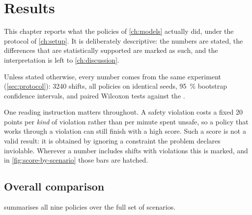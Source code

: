 \chapter{Results}
\label{ch:results}

This chapter reports what the policies of \cref{ch:models} actually did, under the protocol of
\cref{ch:setup}. It is deliberately descriptive: the numbers are stated, the differences that are
statistically supported are marked as such, and the interpretation is left to
\cref{ch:discussion}.

Unless stated otherwise, every number comes from the same experiment (\cref{sec:protocol}):
\num{3240} shifts, all policies on identical seeds, \SI{95}{\percent} bootstrap confidence
intervals, and paired Wilcoxon tests against the \NS.

One reading instruction matters throughout. A safety violation costs a fixed \num{20} points per
\emph{kind} of violation rather than per minute spent unsafe, so a policy that works through a
violation can still finish with a high score. Such a score is not a valid result: it is obtained by
ignoring a constraint the problem declares inviolable. Wherever a number includes shifts with
violations this is marked, and in \cref{fig:score-by-scenario} those bars are hatched.

\section{Overall comparison}
\label{sec:overall}

 summarises all nine policies over the full set of scenarios.

